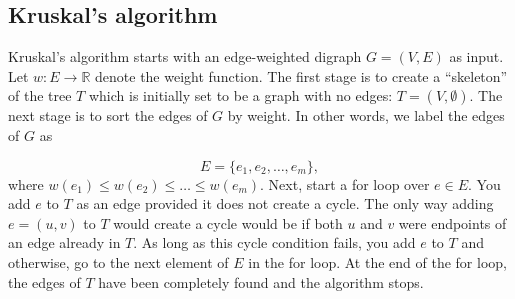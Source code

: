 \subsection{Kruskal's algorithm}

Kruskal's algorithm starts with an edge-weighted digraph $G=(V,E)$
as input. Let $w:E\to {\mathbb{R}}$ denote the weight function.
The first stage is to create a ``skeleton'' of the
tree $T$ which is initially set to be a graph with no
edges: $T=(V,\emptyset)$. The next stage is to
sort the edges of $G$ by weight. In other words, we
label the edges of $G$ as

\[
E = \{e_1,e_2,\dots ,e_m\},
\]
where $w(e_1) \leq w(e_2) \leq \dots \leq w(e_m)$.
Next, start a for loop over $e\in E$. You add
$e$ to $T$ as an edge provided it does not create
a cycle. The only way adding $e=(u,v)$ to $T$ would
create a cycle would be if both $u$ and $v$ were
endpoints of an edge already in $T$. As long as this
cycle condition fails, you add $e$ to $T$ and otherwise,
go to the next element of $E$ in the for loop.
At the end of the for loop, the edges of $T$ have
been completely found and the algorithm stops.

